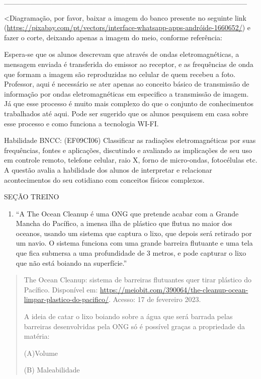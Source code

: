 \_\_\_\_\_\_\_\_\_\_\_\_\_\_\_\_\_\_\_\_\_\_\_\_\_\_\_\_\_\_\_\_\_\_\_\_\_\_\_\_\_\_\_\_\_\_

\textless{}Diagramação, por favor, baixar a imagem do banco presente no
seguinte link
(\url{https://pixabay.com/pt/vectors/interface-whatsapp-apps-andróide-1660652/})
e fazer o corte, deixando apenas a imagem do meio, conforme referência:

Espera-se que os alunos descrevam que através de ondas eletromagnéticas,
a mensagem enviada é transferida do emissor ao receptor, e as
frequências de onda que formam a imagem são reproduzidas no celular de
quem recebeu a foto. Professor, aqui é necessário se ater apenas ao
conceito básico de transmissão de informação por ondas eletromagnéticas
em especifico a transmissão de imagem. Já que esse processo é muito mais
complexo do que o conjunto de conhecimentos trabalhados até aqui. Pode
ser sugerido que os alunos pesquisem em casa sobre esse processo e como
funciona a tecnologia WI-FI.

Habilidade BNCC: (EF09CI06) Classificar as radiações eletromagnéticas
por suas frequências, fontes e aplicações, discutindo e avaliando as
implicações de seu uso em controle remoto, telefone celular, raio X,
forno de micro-ondas, fotocélulas etc. A questão avalia a habilidade dos
alunos de interpretar e relacionar acontecimentos do seu cotidiano com
conceitos físicos complexos.

SEÇÃO TREINO

\begin{enumerate}
\def\labelenumi{\arabic{enumi})}
\item
  ``A The Ocean Cleanup é uma ONG que pretende acabar com a Grande
  Mancha do Pacífico, a imensa ilha de plástico que flutua no maior dos
  oceanos, usando um sistema que captura o lixo, que depois será
  retirado por um navio. O sistema funciona com uma grande barreira
  flutuante e uma tela que fica submersa a uma profundidade de 3 metros,
  e pode capturar o lixo que não está boiando na superfície.''
\end{enumerate}

\begin{quote}
The Ocean Cleanup: sistema de barreiras flutuantes quer tirar plástico
do Pacífico. Disponível em:
\url{https://meiobit.com/390064/the-cleanup-ocean-limpar-plastico-do-pacifico/}.
Acesso: 17 de fevereiro 2023.

A ideia de catar o lixo boiando sobre a água que será barrada pelas
barreiras desenvolvidas pela ONG só é possível graças a propriedade da
matéria:

(A)Volume

(B) Maleabilidade
\end{quote}

